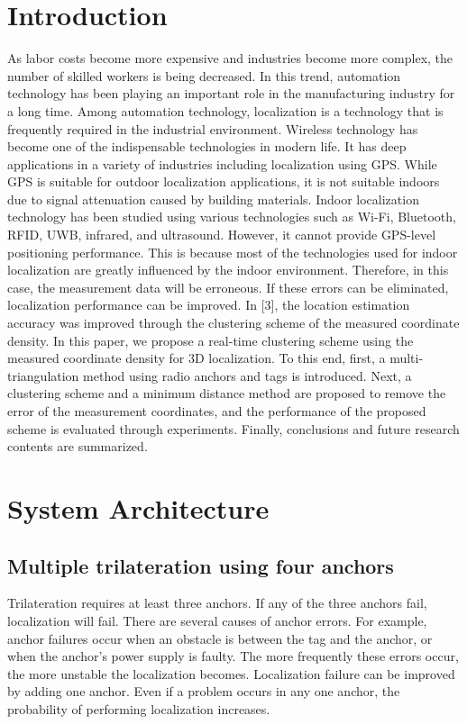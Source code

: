 \documentclass[conference]{IEEEtran}
\begin{document}
\section{Introduction}
As labor costs become more expensive and industries become more complex, the number of skilled workers is being decreased. In this trend, automation technology has been playing an important role in the manufacturing industry for a long time\cite{b1}. Among automation technology, localization is a technology that is frequently required in the industrial environment. Wireless technology has become one of the indispensable technologies in modern life. It has deep applications in a variety of industries including localization using GPS\cite{b2}. While GPS is suitable for outdoor localization applications, it is not suitable indoors due to signal attenuation caused by building materials. Indoor localization technology has been studied using various technologies such as Wi-Fi, Bluetooth, RFID, UWB, infrared, and ultrasound\cite{b3}. However, it cannot provide GPS-level positioning performance. This is because most of the technologies used for indoor localization are greatly influenced by the indoor environment. Therefore, in this case, the measurement data will be erroneous. If these errors can be eliminated, localization performance can be improved. In [3], the location estimation accuracy was improved through the clustering scheme of the measured coordinate density\cite{b4}. In this paper, we propose a real-time clustering scheme using the measured coordinate density for 3D localization. To this end, first, a multi-triangulation method using radio anchors and tags is introduced\cite{b5}. Next, a clustering scheme and a minimum distance method are proposed to remove the error of the measurement coordinates, and the performance of the proposed scheme is evaluated through experiments\cite{b6}. Finally, conclusions and future research contents are summarized\cite{b7}.

\section{System Architecture}

\subsection{Multiple trilateration using four anchors}
Trilateration requires at least three anchors. If any of the three anchors fail, localization will fail. There are several causes of anchor errors. For example, anchor failures occur when an obstacle is between the tag and the anchor, or when the anchor's power supply is faulty. The more frequently these errors occur, the more unstable the localization becomes. 
Localization failure can be improved by adding one anchor. 
Even if a problem occurs in any one anchor, the probability of performing localization increases.
\end{document}
